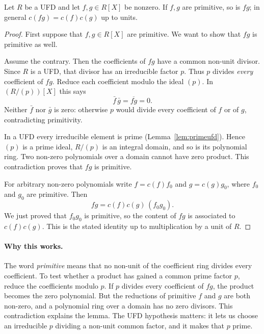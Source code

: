 \begin{lemma}[Gauss]\label{lem:gauss}
Let $R$ be a UFD and let $f,g\in R[X]$ be nonzero. If $f,g$ are primitive, so is $fg$; in general $c(fg)=c(f)c(g)$ up to units.
\end{lemma}
\begin{proof}
First suppose that $f,g\in R[X]$ are primitive. We want to show that $fg$ is primitive as well.

Assume the contrary. Then the coefficients of $fg$ have a common non-unit divisor. Since $R$ is a UFD, that divisor has an irreducible factor $p$. Thus $p$ divides \emph{every} coefficient of $fg$. Reduce each coefficient modulo the ideal $(p)$. In $(R/(p))[X]$ this says
\[
\bar f\,\bar g=\overline{fg}=0.
\]
Neither $\bar f$ nor $\bar g$ is zero: otherwise $p$ would divide every coefficient of $f$ or of $g$, contradicting primitivity.

In a UFD every irreducible element is prime (Lemma~\ref{lem:primeufd}). Hence $(p)$ is a prime ideal, $R/(p)$ is an integral domain, and so is its polynomial ring. Two non-zero polynomials over a domain cannot have zero product. This contradiction proves that $fg$ is primitive.

For arbitrary non-zero polynomials write $f=c(f)f_0$ and $g=c(g)g_0$, where $f_0$ and $g_0$ are primitive. Then
\[
fg=c(f)c(g)\,(f_0g_0).
\]
We just proved that $f_0g_0$ is primitive, so the content of $fg$ is associated to $c(f)c(g)$. This is the stated identity up to multiplication by a unit of $R$.
\end{proof}

\paragraph{Why this works.}
The word \emph{primitive} means that no non-unit of the coefficient ring divides every coefficient. To test whether a product has gained a common prime factor $p$, reduce the coefficients modulo $p$. If $p$ divides every coefficient of $fg$, the product becomes the zero polynomial. But the reductions of primitive $f$ and $g$ are both non-zero, and a polynomial ring over a domain has no zero divisors. This contradiction explains the lemma. The UFD hypothesis matters: it lets us choose an irreducible $p$ dividing a non-unit common factor, and it makes that $p$ prime.

